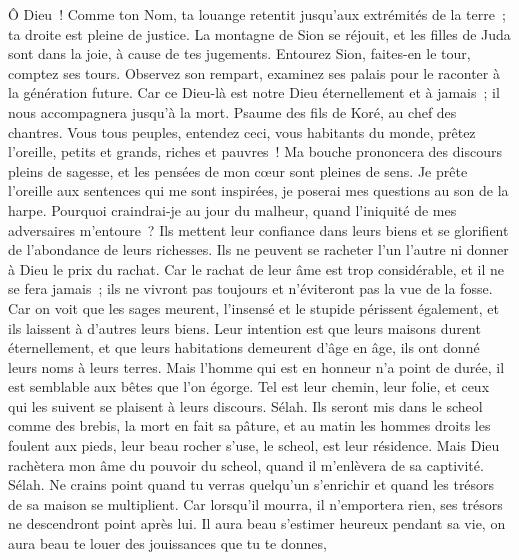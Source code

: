 \begin{multicols}{2}
Ô Dieu~! Comme ton Nom, ta louange retentit jusqu'aux extrémités de la terre~; ta droite est pleine de justice.
La montagne de Sion se réjouit, et les filles de Juda sont dans la joie, à cause de tes jugements.
Entourez Sion, faites-en le tour, comptez ses tours.
Observez son rempart, examinez ses palais pour le raconter à la génération future.
Car ce Dieu-là est notre Dieu éternellement et à jamais~; il nous accompagnera jusqu'à la mort.
\VerseOne{}Psaume des fils de Koré, au chef des chantres.
Vous tous peuples, entendez ceci, vous habitants du monde, prêtez l'oreille,
petits et grands, riches et pauvres~!
Ma bouche prononcera des discours pleins de sagesse, et les pensées de mon cœur sont pleines de sens.
Je prête l'oreille aux sentences qui me sont inspirées, je poserai mes questions au son de la harpe.
Pourquoi craindrai-je au jour du malheur, quand l'iniquité de mes adversaires m'entoure~?
Ils mettent leur confiance dans leurs biens et se glorifient de l'abondance de leurs richesses.
Ils ne peuvent se racheter l'un l'autre ni donner à Dieu le prix du rachat.
Car le rachat de leur âme est trop considérable, et il ne se fera jamais~;
ils ne vivront pas toujours et n'éviteront pas la vue de la fosse.
Car on voit que les sages meurent, l'insensé et le stupide périssent également, et ils laissent à d'autres leurs biens.
Leur intention est que leurs maisons durent éternellement, et que leurs habitations demeurent d'âge en âge, ils ont donné leurs noms à leurs terres.
Mais l'homme qui est en honneur n'a point de durée, il est semblable aux bêtes que l'on égorge.
Tel est leur chemin, leur folie, et ceux qui les suivent se plaisent à leurs discours. Sélah.
Ils seront mis dans le scheol comme des brebis, la mort en fait sa pâture, et au matin les hommes droits les foulent aux pieds, leur beau rocher s'use, le scheol, est leur résidence.
Mais Dieu rachètera mon âme du pouvoir du scheol, quand il m'enlèvera de sa captivité. Sélah.
Ne crains point quand tu verras quelqu'un s'enrichir et quand les trésors de sa maison se multiplient.
Car lorsqu'il mourra, il n'emportera rien, ses trésors ne descendront point après lui.
Il aura beau s'estimer heureux pendant sa vie, on aura beau te louer des jouissances que tu te donnes,

\end{multicols}
